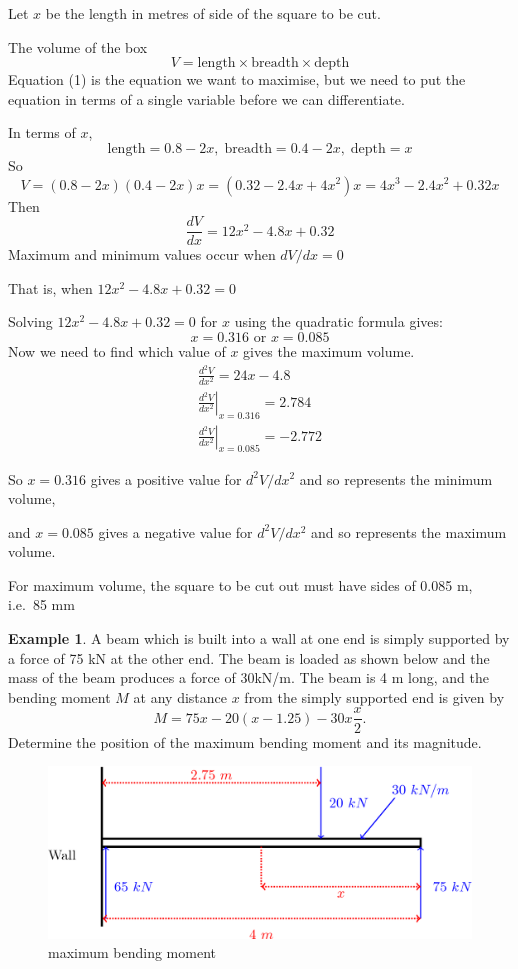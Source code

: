 \documentclass[
  11pt,
  oneside]{book}
\newcommand{\slide}{}
\theoremstyle{definition}
\theoremstyle{definition}
\newtheorem{example}{Example}[chapter]
\theoremstyle{definition}
\theoremstyle{definition}
\theoremstyle{remark}
\begin{document}
Let \(x\) be the length in metres of side of the square to be cut.

The volume of the box
\[
V = \text{length}\times\text{breadth}\times\text{depth}\tag{1}
\]
Equation (1) is the equation we want to maximise, but we need to put the equation in terms of a single variable before we can differentiate.

In terms of \(x\),
\[
\text{length} = 0.8 - 2x,\; \text{breadth} = 0.4 - 2x,\;\text{depth} = x
\]
So
\[
V = (0.8 - 2x)(0.4 - 2x)x = (0.32 - 2.4x + 4x^2)x = 4x^3 - 2.4x^2 + 0.32x
\]
Then
\[
\frac{dV}{dx} = 12x^2 - 4.8x + 0.32
\]
Maximum and minimum values occur when \(dV/dx  = 0\)

That is, when \(12x^2 - 4.8x + 0.32= 0\)

Solving \(12x^2 - 4.8x + 0.32= 0\) for \(x\) using the quadratic formula gives:
\[
 x = 0.316\text{ or }x = 0.085
\]
Now we need to find which value of \(x\) gives the maximum volume.
\begin{gather*}
\frac{d^2V}{dx^2}= 24x - 4.8\\
\left.\frac{d^2V}{dx^2}\right\vert_{x=0.316} = 2.784\\
\left.\frac{d^2V}{dx^2}\right\vert_{x=0.085} = -2.772
\end{gather*}

\slide

So \(x=0.316\) gives a positive value for \(d^2V/dx^2\) and so represents the minimum volume,

and \(x=0.085\) gives a negative value for \(d^2V/dx^2\) and so represents the maximum volume.

For maximum volume, the square to be cut out must have sides of 0.085 m, i.e.~85 mm
\slide

\begin{example}
A beam which is built into a wall at one end is simply supported by a force of 75 kN at the other end. The beam is loaded as shown below and the mass of the beam produces a force of 30kN/m. The beam is 4 m long, and the bending moment \(M\) at any distance \(x\) from the simply supported end is given by
\[
M = 75x-20(x-1.25)-30x\frac{x}{2}.
\]
Determine the position of the maximum bending moment and its magnitude.
\end{example}

\begin{figure}

{\centering \includegraphics[width=0.55\linewidth]{tikztopng-figure14} 

}

\caption{maximum bending moment}\label{fig:unnamed-chunk-29}
\end{figure}
\end{document}
